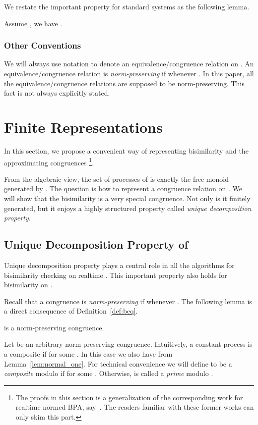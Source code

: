 \documentclass{llncs}
\begin{document}
We restate the important property for standard systems as the following lemma.
\begin{lemma}\label{lem:decreasing_transition}
Assume , we have .
\end{lemma}


\subsubsection{Other Conventions}

We will always use notation  to denote an equivalence/congruence relation on .  An equivalence/congruence relation  is {\em norm-preserving} if   whenever . In this paper, all the equivalence/congruence relations are supposed to be norm-preserving. This fact is not always explicitly stated.






\section{Finite Representations}\label{sec:finite_representations}

In this section, we propose  a convenient way of representing bisimilarity and the approximating congruences \footnote{The proofs in this section is a generalization of the corresponding work for realtime normed BPA, say~\cite{DBLP:journals/tcs/HirshfeldJM96}. The readers familiar with these former works can only skim this part.}.

From the algebraic view, the set of processes of  is exactly the free monoid generated by .  The question is how to represent a congruence relation on .
We will show that the bisimilarity  is a very special congruence. Not only is it finitely generated, but it enjoys a highly structured property called {\em unique decomposition property}.


\subsection{Unique Decomposition Property of }

Unique decomposition property plays a central role in all the algorithms for bisimilarity checking on realtime . This important property also holds for bisimilarity on .

Recall that a congruence  is {\em norm-preserving} if  whenever . The following lemma is a direct consequence of Definition~\ref{def:beq}.
\begin{lemma}\label{lem:norm-preserving}
 is a norm-preserving congruence.
\end{lemma}
Let  be an arbitrary norm-preserving congruence.
Intuitively, a constant process  is a composite if  for some . In this case we also have  from Lemma~\ref{lem:normal_one}.
For technical convenience we will define  to be a {\em composite} modulo  if  for some . Otherwise,  is called a {\em prime} modulo .
\end{document}
